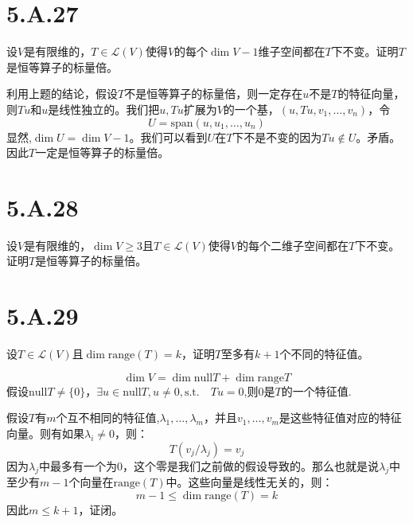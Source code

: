 \documentclass[10pt,a4paper,UTF8]{article}
\begin{document}
\section{5.A.27}
\label{sec:orgc577bb2}


\begin{problem}
设\(V\)是有限维的，\(T\in \mathcal{L}(V)\)使得\(V\)的每个\(\dim V -1\)维子空间都在\(T\)下不变。证明\(T\)是恒等算子的标量倍。
\end{problem}

\begin{answer}
利用上题的结论，假设\(T\)不是恒等算子的标量倍，则一定存在\(u\)不是\(T\)的特征向量，则\(Tu\)和\(u\)是线性独立的。我们把\(u,Tu\)扩展为\(V\)的一个基，\((u,Tu,v_{1},\ldots ,v_{n})\)，令
\[U = \mathrm{span}(u,u_{1},\ldots ,u_{n})\]
显然,\(\dim U = \dim V -1\)。我们可以看到\(U\)在\(T\)下不是不变的因为\(Tu\notin U\)。矛盾。因此\(T\)一定是恒等算子的标量倍。
\end{answer}

\section{5.A.28}
\label{sec:org0b4a9ab}


\begin{problem}
设\(V\)是有限维的，\(\dim V \geq 3\)且\(T\in \mathcal{L}(V)\)使得\(V\)的每个二维子空间都在\(T\)下不变。证明\(T\)是恒等算子的标量倍。
\end{problem}

\begin{answer}

\end{answer}
\section{5.A.29}
\label{sec:orgdc94855}


\begin{problem}
设\(T\in \mathcal{L}(V)\)且\(\dim \mathrm{range}(T) = k\)，证明\(T\)至多有\(k+1\)个不同的特征值。
\end{problem}

\begin{answer}
\[\dim V = \dim \mathrm{null}T + \dim \mathrm{range}T\]
假设\(\mathrm{null}T \neq \{0\}\)，\(\exists u\in \mathrm{null}T, u\neq 0, \mathrm{s.t.} \quad Tu = 0\),则\(0\)是\(T\)的一个特征值.

假设\(T\)有\(m\)个互不相同的特征值,\(\lambda_{1},\ldots ,\lambda_{m}\)，并且\(v_{1},\ldots ,v_{m}\)是这些特征值对应的特征向量。则有如果\(\lambda_{i}\neq 0\)，则：
\begin{equation}
\label{eq:25}
T(v_{j}/\lambda_{j})= v_{j}
\end{equation}
因为\(\lambda_{j}\)中最多有一个为\(0\)，这个零是我们之前做的假设导致的。那么也就是说\(\lambda_{j}\)中至少有\(m-1\)个向量在\(\mathrm{range}(T)\)中。这些向量是线性无关的，则：
\begin{equation}
\label{eq:26}
m - 1 \leq \dim \mathrm{range}(T) = k
\end{equation}
因此\(m\leq k+1\)，证闭。
\end{answer}
\end{document}
